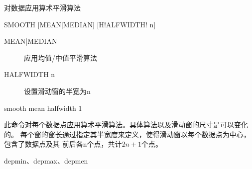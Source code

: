 \label{cmd:smooth}

对数据应用算术平滑算法

\begin{SACSTX}
SMOOTH [MEAN|MEDIAN] [H!ALFWIDTH! n]
\end{SACSTX}

\begin{description}
\item [MEAN|MEDIAN] 应用均值/中值平滑算法 
\item [HALFWIDTH n] 设置滑动窗的半宽为n
\end{description}

\begin{SACDFT}
smooth mean halfwidth 1
\end{SACDFT}

此命令对每个数据点应用算术平滑算法。具体算法以及滑动窗的尺寸是可以变化的。
每个窗的窗长通过指定其半宽度来定义，使得滑动窗以每个数据点为中心，包含了数据点及其
前后各n个点，共计$2n+1$个点。

depmin、depmax、depmen
